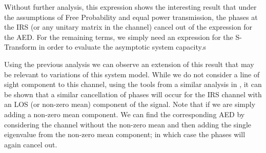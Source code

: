 \par
Without further analysis, this expression shows the interesting result that under the assumptions of Free Probability and equal power transmission, the phases at the IRS (or any unitary matrix in the channel) cancel out of the expression for the AED. For the remaining terms, we simply need an expression for the S-Transform in order to evaluate the asymptotic system capacity.s
\par 
Using the previous analysis we can observe an extension of this result that may be relevant to variations of this system model. 
While we do not consider a line of sight component to this channel, using the tools from a similar analysis in \cite{muller2012channel}, it can be shown that 
a similar cancellation of phases will occur for the IRS channel with an LOS (or non-zero mean) component of the signal.
Note that if we are simply adding a non-zero mean component. We can find the corresponding AED by considering the channel without the non-zero mean and then adding the single eigenvalue from the non-zero mean component; in which case the phases will again cancel out. 



